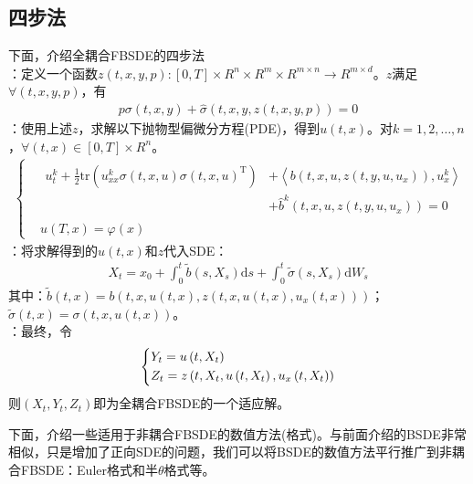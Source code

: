 	\subsection{四步法}
	下面，介绍全耦合FBSDE的四步法\\
		：定义一个函数$z(t,x,y,p):[0,T]\times R^n\times R^m\times R^{m\times n}\rightarrow {R^{m\times d}}$。$z$满足$\forall(t,x,y,p)$，有
		\begin{align*}
		p\sigma \left( {t,x,y} \right) + \hat \sigma \left( {t,x,y,z\left( {t,x,y,p} \right)} \right) = 0
		\end{align*}
		：使用上述$z$，求解以下抛物型偏微分方程(PDE)，得到$u(t,x)$。对$k=1,2,\dots,n$，$\forall(t,x) \in [0,T]\times R^n$。
		\begin{align*}
		\left\{
		\begin{aligned}
		& \begin{aligned}
		u_t ^k + \frac{1}{2}\mathrm{tr}\left( {u_{xx}^k\sigma \left( {t,x,u} \right)\sigma {{\left( {t,x,u} \right)}^\mathrm{T}}} \right) &+ \left\langle {b\left( {t,x,u,z\left( {t,y,u,{u_x}} \right)} \right),u_x^k} \right\rangle\\
			&+ {{\hat b}^k}\left( {t,x,u,z\left( {t,y,u,{u_x}} \right)} \right) = 0
		\end{aligned}\\
		& u(T,x)=\varphi(x)
		\end{aligned}
		\right.
		\end{align*}
		：将求解得到的$u(t,x)$和$z$代入SDE：
		\begin{align*}
		{X_t} = {x_0} + \int_0^t {\tilde b\left( {s,{X_s}} \right)\mathrm{d}s}  + \int_0^t {\tilde \sigma \left( {s,{X_s}} \right)\mathrm{d}{W_s}} \end{align*}
		其中：$\tilde b(t,x)=b(t,x,u(t,x),z(t,x,u(t,x),u_x(t,x)))$；$\tilde\sigma (t,x)=\sigma(t,x,u(t,x))$。\\
		：最终，令
					\begin{equation*}
				\centering
				\left\{\begin{lgathered}
				{{Y_t} = u\left( {t,{X_t}} \right)}\\
				{{Z_t} = z\left( {t,{X_t},u\left( {t,{X_t}} \right),{u_x}\left( {t,{X_t}} \right)} \right)}
				\end{lgathered} \right.
					\end{equation*}
		 则$(X_t,Y_t,Z_t)$即为全耦合FBSDE的一个适应解。

		\par
		下面，介绍一些适用于非耦合FBSDE的数值方法(格式)。与前面介绍的BSDE非常相似，只是增加了正向SDE的问题，我们可以将BSDE的数值方法平行推广到非耦合FBSDE：Euler格式和半$\theta$格式等。

